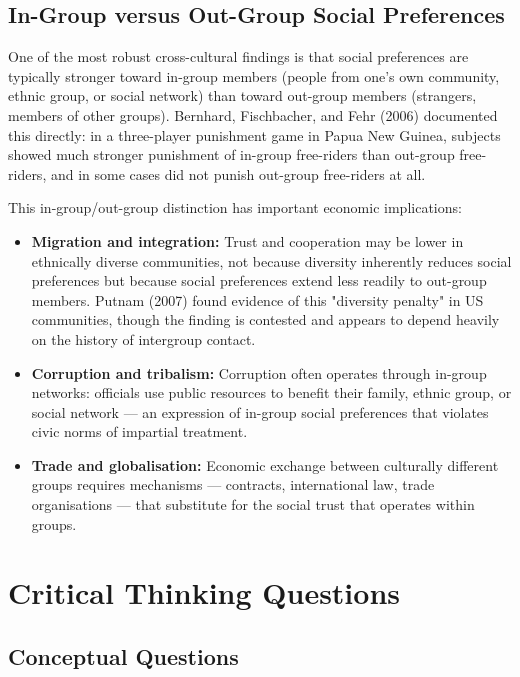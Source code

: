 \documentclass[12pt, letterpaper]{article}
\begin{document}
\subsection{In-Group versus Out-Group Social Preferences}


One of the most robust cross-cultural findings is that social preferences are typically stronger toward in-group members (people from one's own community, ethnic group, or social network) than toward out-group members (strangers, members of other groups). Bernhard, Fischbacher, and Fehr (2006) documented this directly: in a three-player punishment game in Papua New Guinea, subjects showed much stronger punishment of in-group free-riders than out-group free-riders, and in some cases did not punish out-group free-riders at all.

This in-group/out-group distinction has important economic implications:

\begin{itemize}
\item \textbf{Migration and integration:} Trust and cooperation may be lower in ethnically diverse communities, not because diversity inherently reduces social preferences but because social preferences extend less readily to out-group members. Putnam (2007) found evidence of this "diversity penalty" in US communities, though the finding is contested and appears to depend heavily on the history of intergroup contact.
\item \textbf{Corruption and tribalism:} Corruption often operates through in-group networks: officials use public resources to benefit their family, ethnic group, or social network --- an expression of in-group social preferences that violates civic norms of impartial treatment.
\item \textbf{Trade and globalisation:} Economic exchange between culturally different groups requires mechanisms --- contracts, international law, trade organisations --- that substitute for the social trust that operates within groups.
\end{itemize}

\newpage


\section*{Critical Thinking Questions}

\subsection{Conceptual Questions}
\end{document}
